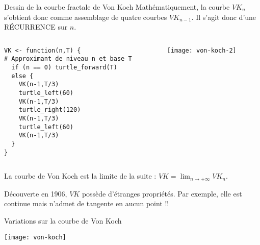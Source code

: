 \documentclass[10pt]{beamer}
\begin{document}
\begin{frame}[fragile]{Dessin de la courbe fractale de Von Koch}
  Mathématiquement, la courbe $VK_n$ s'obtient donc comme assemblage de quatre courbes $VK_{n-1}$.
  Il s'agit donc d'une RÉCURRENCE sur $n$.

\begin{columns}[c]
\begin{column}{0.6\textwidth}
  \begin{lstlisting}
VK <- function(n,T) {
# Approximant de niveau n et base T
  if (n == 0) turtle_forward(T)
  else {
    VK(n-1,T/3)
    turtle_left(60)
    VK(n-1,T/3)
    turtle_right(120)
    VK(n-1,T/3)
    turtle_left(60)
    VK(n-1,T/3)
  }
}
  \end{lstlisting}
\end{column}
\begin{column}{0.38\textwidth}
  \texttt{[image: von-koch-2]}
\end{column}
\end{columns}
La courbe de Von Koch est la limite de la suite : $VK = \lim_{n \rightarrow + \infty} VK_n$.

Découverte en 1906, $VK$ possède d'étranges propriétés. Par exemple, elle est continue mais n'admet de tangente en aucun point !!
\end{frame}


\begin{frame}{Variations sur la courbe de Von Koch}
  \begin{center}
    \texttt{[image: von-koch]}
  \end{center}
\end{frame}



\questionSlide

 \appendix
 \backupSlides







\end{document}
